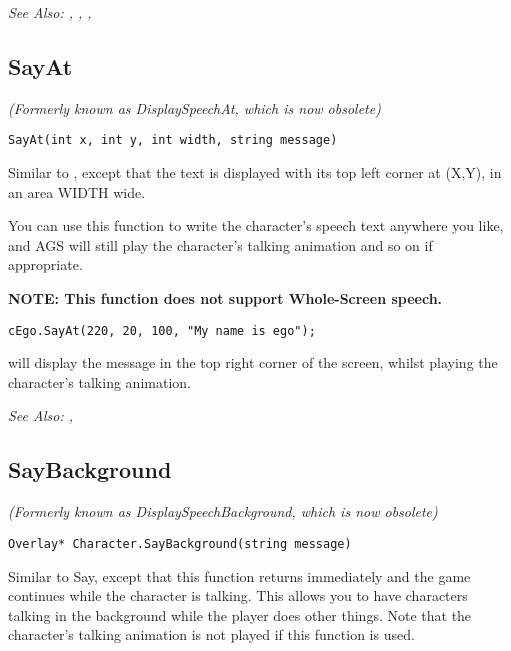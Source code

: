 \it{See Also:} , ,
,


\subsection{SayAt}\label{Character.SayAt}%

\it{(Formerly known as DisplaySpeechAt, which is now obsolete)}

\begin{verbatim}
SayAt(int x, int y, int width, string message)
\end{verbatim}
Similar to , except that the text is displayed with its top
left corner at (X,Y), in an area WIDTH wide.

You can use this function to write the character's speech text anywhere you like, and
AGS will still play the character's talking animation and so on if appropriate.

\bf{NOTE:} This function does not support Whole-Screen speech.

\begin{verbatim}
cEgo.SayAt(220, 20, 100, "My name is ego");
\end{verbatim}
will display the message in the top right corner of the screen, whilst playing the
character's talking animation.

\it{See Also:} ,


\subsection{SayBackground}\label{Character.SayBackground}%

\it{(Formerly known as DisplaySpeechBackground, which is now obsolete)}

\begin{verbatim}
Overlay* Character.SayBackground(string message)
\end{verbatim}
Similar to Say, except that this function returns immediately
and the game continues while the character is talking. This allows you
to have characters talking in the background while the player does other
things. Note that the character's talking animation is not played if this
function is used.

